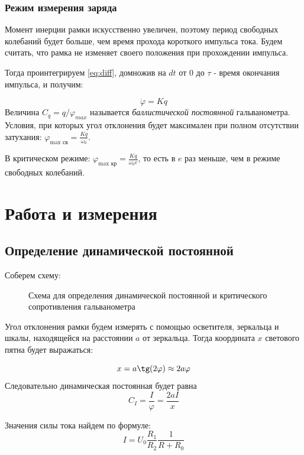 \documentclass[a4paper, 12pt]{article}
\begin{document}
\subsubsection*{Режим измерения заряда}

Момент инерции рамки искусственно увеличен, поэтому период свободных колебаний будет больше, чем время прохода короткого импульса тока. Будем считать, что рамка не изменяет своего положения при прохождении импульса.

Тогда проинтегрируем \ref{eq:diff}, домножив на $dt$ от $0$ до $\tau$ - время окончания импульса,  и получим:

$$\dot{\varphi} = K q$$
Величина $C_q = q/\varphi_{max}$ называется \textit{баллистической постоянной} гальванометра. Условия, при которых угол отклонения будет максимален при полном отсутствии затухания: $\varphi_\text{max св} = \frac{Kq}{\omega_0}$. 

В критическом режиме: 
$\varphi_\text{max кр} = \frac{Kq}{\omega_0e}$, то есть в $e$ раз меньше, чем в режиме свободных колебаний.

\section{Работа и измерения}


\subsection*{Определение динамической постоянной}

Соберем схему:

	\begin {figure}[H]
		\begin{center}
			\caption{Схема для определения динамической постоянной и критического сопротивления гальванометра}
		\end{center}
	\end {figure}

Угол отклонения рамки будем измерять с помощью осветителя, зеркальца и шкалы, находящейся на расстоянии $a$ от зеркальца. Тогда координата $x$ светового пятна будет выражаться:

$$x=a\tg(2\varphi) \approx 2a\varphi$$
Следовательно динамическая постоянная будет равна 
$$C_I = \dfrac{I}{\varphi} = \dfrac{2aI}{x}$$

Значения силы тока найдем по формуле: $$I = U_0 \dfrac{R_1}{R_2}\dfrac{1}{R+R_0}$$
\end{document}
